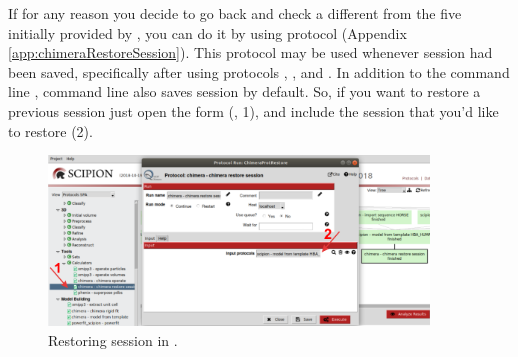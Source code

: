 If for any reason you decide to go back and check a different  from the five  initially provided by \modeller, you can do it by using  protocol (Appendix \ref{app:chimeraRestoreSession}). This protocol may be used whenever \chimera session had been saved, specifically after using protocols \chimera {}, \chimera {}, and \chimera {}. In addition to the \chimera command line , command line  also saves \chimera session by default. So, if you want to restore a previous session just open the form (, 1), and include the session that you'd like to restore (2).

 \begin{figure}[H]
  \centering 
  \captionsetup{width=.7\linewidth} 
  \includegraphics[width=0.90\textwidth]{Images/Fig17}
  \caption{Restoring session in \chimera.}
  \label{fig:restore_session_protocol}
  \end{figure}
